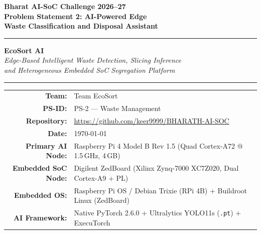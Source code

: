 \documentclass[12pt,a4paper]{article}
\begin{document}
\begin{titlepage}
\centering
\vspace*{1.2cm}

{\LARGE\bfseries\color{ecosortblue}
  Bharat AI-SoC Challenge 2026--27\\[0.4em]
  Problem Statement 2: AI-Powered Edge\\[0.2em]
  Waste Classification and Disposal Assistant
}

\vspace{0.8cm}
\rule{14cm}{1.5pt}
\vspace{0.4cm}

{\Huge\bfseries\color{ecosortgreen} EcoSort AI}\\[0.4em]
{\large\itshape Edge-Based Intelligent Waste Detection, Slicing Inference\\
  and Heterogeneous Embedded SoC Segregation Platform}

\vspace{0.6cm}
\rule{14cm}{0.4pt}
\vspace{0.8cm}

{\large
\begin{tabular}{rl}
  \textbf{Team:}             & Team EcoSort \\[4pt]
  \textbf{PS-ID:}            & PS-2 — Waste Management \\[4pt]
  \textbf{Repository:}       & \url{https://github.com/keer9999/BHARATH-AI-SOC} \\[4pt]
  \textbf{Date:}             & \today \\[4pt]
  \textbf{Primary AI Node:}  & Raspberry Pi 4 Model B Rev 1.5 (Quad Cortex-A72 @ 1.5\,GHz, 4\,GB) \\[4pt]
  \textbf{Embedded SoC Node:}& Digilent ZedBoard (Xilinx Zynq-7000 XC7Z020, Dual Cortex-A9 + PL) \\[4pt]
  \textbf{Embedded OS:}      & Raspberry Pi OS / Debian Trixie (RPi 4B) + Buildroot Linux (ZedBoard) \\[4pt]
  \textbf{AI Framework:}     & Native PyTorch 2.6.0 + Ultralytics YOLO11s (\texttt{.pt}) + ExecuTorch \\
\end{tabular}
}

\vspace{1.0cm}


\end{titlepage}
\end{document}
